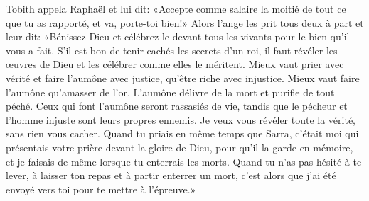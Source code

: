 Tobith appela Raphaël et lui dit:
	«Accepte comme salaire la moitié de tout ce que tu as rapporté,
	et va, porte-toi bien!»
Alors l’ange les prit tous deux à part et leur dit:
	«Bénissez Dieu et célébrez-le devant tous les vivants
		pour le bien qu’il vous a fait.
S’il est bon de tenir cachés les secrets d’un roi,
	il faut révéler les œuvres de Dieu et les célébrer comme elles le méritent.
Mieux vaut prier avec vérité et faire l’aumône avec justice,
	qu’être riche avec injustice.
Mieux vaut faire l’aumône qu’amasser de l’or.
	L’aumône délivre de la mort et purifie de tout péché.
Ceux qui font l’aumône seront rassasiés de vie,
	tandis que le pécheur et l’homme injuste sont leurs propres ennemis.
Je veux vous révéler toute la vérité, sans rien vous cacher. 
Quand tu priais en même temps que Sarra,
	c’était moi qui présentais votre prière devant la gloire de Dieu,
		pour qu’il la garde en mémoire,
	et je faisais de même lorsque tu enterrais les morts.
Quand tu n’as pas hésité à te lever,
		à laisser ton repas et à partir enterrer un mort,
	c’est alors que j’ai été envoyé vers toi pour te mettre à l’épreuve.»
